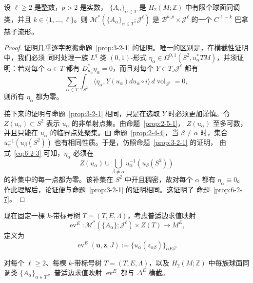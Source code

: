 \begin{proposition}\label{prop:6-2-7}
设 $\ell\ge2$ 是整数，$p>2$ 是实数，
$\{A_\alpha\}_{\alpha\in T}$ 是 $H_2(M;\mathbb Z)$ 中有限个球面同调类，并且
$k\in\{1,\ldots,\ell\}$。则
$\mathcal M^*(\{A_\alpha\}_{\alpha\in T};\mathcal J^\ell)$ 是
$\mathcal B^{k,p}\times\mathcal J^\ell$ 的一个 $C^{\ell-k}$ 巴拿赫子流形。
\end{proposition}

\begin{proof}
证明几乎逐字照搬命题~\ref{prop:3-2-1} 的证明。唯一的区别是，在横截性证明中，我们必须
同时处理一族 $L^q$ 类 $(0,1)$-形式
$\eta_\alpha\in\Omega^{0,1}(S^2,u_\alpha^*TM)$，并须证明：若对每个 $\alpha\in T$ 都有
$D_{u_\alpha}^*\eta_\alpha=0$，而且对每个
$Y\in T_J\mathcal J^\ell$ 都有
\begin{equation}\label{eq:6-2-3}
  \sum_{\alpha\in T}\int_{S^2}
  \bigl\langle\eta_\alpha,
  Y(u_\alpha)du_\alpha\circ i\bigr\rangle
  \,d\operatorname{vol}_{S^2}=0,
\end{equation}
则所有 $\eta_\alpha$ 都为零。

接下来的证明与命题~\ref{prop:3-2-1} 相同，只是在选取 $Y$ 时必须更加谨慎。令
$Z(u_\alpha)\subset S^2$ 表示 $u_\alpha$ 的非单射点集。由命题~\ref{prop:2-5-1}，
$Z(u_\alpha)$ 至多可数，并且只能在 $u_\alpha$ 的临界点处聚集。由
命题~\ref{prop:2-4-4}，当 $\beta\ne\alpha$ 时，集合
$u_\alpha^{-1}(u_\beta(S^2))$ 也有相同性质。于是，仿照命题~\ref{prop:3-2-1} 的证明，
由式~\eqref{eq:6-2-3} 可知，$\eta_\alpha$ 必须在
\[
  Z(u_\alpha)\cup
  \bigcup_{\beta\ne\alpha}u_\alpha^{-1}(u_\beta(S^2))
\]
的补集中的每一点都为零。该补集在 $S^2$ 中开且稠密，故对每个 $\alpha$ 都有
$\eta_\alpha\equiv0$。作此理解后，论证便与命题~\ref{prop:3-2-1} 的证明相同。这证明了
命题~\ref{prop:6-2-7}。
\end{proof}

现在固定一棵 $k$-带标号树 $T=(T,E,\Lambda)$，考虑普适边求值映射
\[
  \operatorname{ev}^E:
  \mathcal M^*(\{A_\alpha\};\mathcal J^\ell)\times Z(T)
  \longrightarrow M^E,
\]
定义为
\[
  \operatorname{ev}^E(\mathbf u,\mathbf z,J)
  :=\{u_\alpha(z_{\alpha\beta})\}_{\alpha E\beta}.
\]

\begin{proposition}\label{prop:6-2-8}
对每个 $\ell\ge2$、每棵 $k$-带标号树 $T=(T,E,\Lambda)$，以及
$H_2(M;\mathbb Z)$ 中每族球面同调类 $\{A_\alpha\}_{\alpha\in T}$，普适边求值映射
$\operatorname{ev}^E$ 都与 $\Delta^E$ 横截。
\end{proposition}

